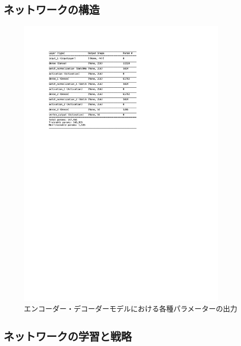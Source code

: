 \subsection{ネットワークの構造} \label{Net:PM:StructureofPM}


\begin{figure}[h]
 \centering
 \includegraphics[trim = 0 200 0 200, width=0.9\textwidth]{Figure/3Networks/3-3-1-1PairModelSummary.png}
 \caption{エンコーダー・デコーダーモデルにおける各種パラメーターの出力}
 \label{3-3-1-3VLSTMSummary}
\end{figure}


\subsection{ネットワークの学習と戦略} \label{Net:PM:TrainingandStrategyofPM}



